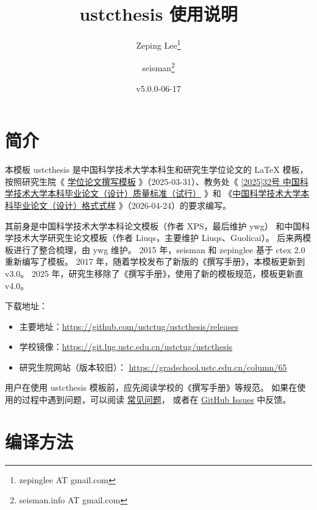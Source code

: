 \documentclass[a4paper]{ltxdoc}
\DeclareRobustCommand\pkg{\textsf}
\DeclareRobustCommand\cls{\textsf}
\begin{document}
\title{\cls{ustcthesis} 使用说明}
\author{Zeping Lee\thanks{zepinglee AT gmail.com} \and
        seisman\thanks{seisman.info AT gmail.com} }
\date{v5.0.0-06-17}
\maketitle



\section{简介}

本模板 \cls{ustcthesis} 是中国科学技术大学本科生和研究生学位论文的 \LaTeX{}
模板， 按照研究生院《
\href{https://gradschool.ustc.edu.cn/column/65}{学位论文撰写模板}
》（2025-03-31）、教务处《
\href{https://www.teach.ustc.edu.cn/?attachment_id=19501}
  {[2025]32号 中国科学技术大学本科毕业论文（设计）质量标准（试行）}
》和
《\href{https://www.teach.ustc.edu.cn/?attachment_id=13867}
  {中国科学技术大学本科毕业论文（设计）格式式样}
》（2026-04-24）的要求编写。

其前身是中国科学技术大学本科论文模板（作者 XPS，最后维护 ywg）
和中国科学技术大学研究生论文模板（作者 Liuqs，主要维护 Liuqs、Guolicai）。
后来两模板进行了整合梳理，由 ywg 维护。
2015 年，seisman 和 zepinglee 基于 \pkg{ctex} 2.0 重新编写了模板。
2017 年，随着学校发布了新版的《撰写手册》，本模板更新到 v3.0。
2025 年，研究生移除了《撰写手册》，使用了新的模板规范，模板更新直 v4.0。

下载地址：
\begin{itemize}
  \item 主要地址：\url{https://github.com/ustctug/ustcthesis/releases}
  \item 学校镜像：\url{https://git.lug.ustc.edu.cn/ustctug/ustcthesis}
  \item 研究生院网站（版本较旧）：
    \url{https://gradschool.ustc.edu.cn/column/65}
\end{itemize}

用户在使用 \pkg{ustcthesis} 模板前，应先阅读学校的《撰写手册》等规范。
如果在使用的过程中遇到问题，可以阅读
\href{https://github.com/ustctug/ustcthesis/wiki}{常见问题}，
或者在 \href{https://github.com/ustctug/ustcthesis/issues}{GitHub Issues}
中反馈。



\section{编译方法}
\end{document}
